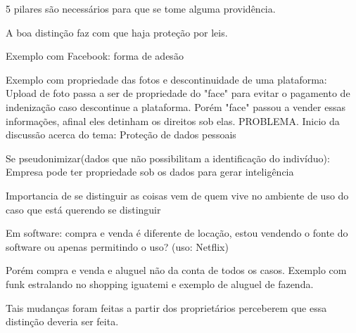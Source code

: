 \documentclass[12pt]{article}
\begin{document}
5 pilares são necessários para que se tome alguma providência.

A boa distinção faz com que haja proteção por leis.

Exemplo com Facebook: forma de adesão

Exemplo com propriedade das fotos e descontinuidade de uma plataforma:
Upload de foto passa a ser de propriedade do "face" para evitar o pagamento
de indenização caso descontinue a plataforma. Porém "face" passou a vender
essas informações, afinal eles detinham os direitos sob elas. PROBLEMA.
Inicio da discussão acerca do tema: Proteção de dados pessoais

Se pseudonimizar(dados que não possibilitam a identificação do indivíduo):
Empresa pode ter propriedade sob os dados para gerar inteligência

Importancia de se distinguir as coisas vem de quem vive no ambiente de uso do
caso que está querendo se distinguir

Em software: compra e venda é diferente de locação, estou vendendo o fonte do
software ou apenas permitindo o uso? (uso: Netflix)

Porém compra e venda e aluguel não da conta de todos os casos. Exemplo com
funk estralando no shopping iguatemi e exemplo de aluguel de fazenda.

Tais mudanças foram feitas a partir dos proprietários perceberem que essa
distinção deveria ser feita.
 
\end{document}
